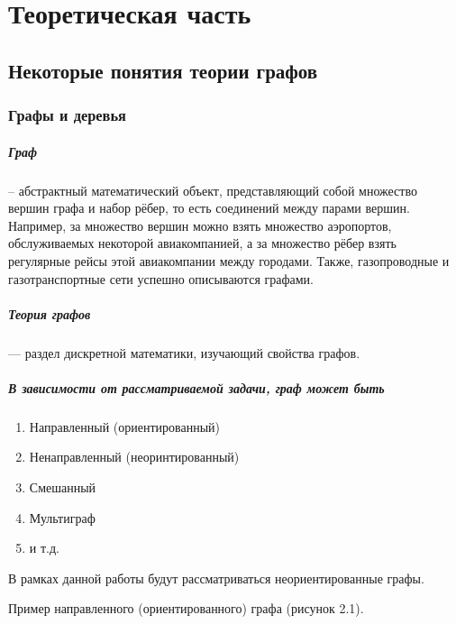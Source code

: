 \chapter{Теоретическая часть}
\section{Некоторые понятия теории графов}
\subsection{Графы и деревья}
\paragraph{Граф} -- абстрактный математический объект, представляющий собой множество вершин графа и набор рёбер, то есть соединений между парами вершин. Например, за множество вершин можно взять множество аэропортов, обслуживаемых некоторой авиакомпанией, а за множество рёбер взять регулярные рейсы этой авиакомпании между городами.
Также, газопроводные и газотранспортные сети успешно описываются графами.

\paragraph{Теория графов} — раздел дискретной математики, изучающий свойства графов. 

\paragraph{В зависимости от рассматриваемой задачи, граф может быть}
\begin{enumerate}
\item Направленный (ориентированный)
\item Ненаправленный (неоринтированный)
\item Смешанный
\item Мультиграф
\item и т.д.
\end {enumerate}

В рамках данной работы будут рассматриваться неориентированные графы.

Пример направленного (ориентированного) графа (рисунок 2.1).

